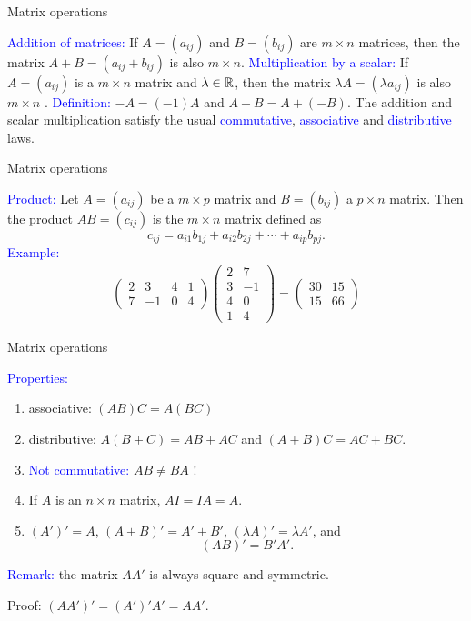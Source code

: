 \documentclass[11pt,aspectratio=169]{beamer}
\begin{document}
\begin{frame}{Matrix operations}

\textcolor{blue}{Addition of matrices: }If $A=(a_{ij})$ and $B=(b_{ij})$  are $m \times n$ matrices, then the matrix
$A+B=(a_{ij}+b_{ij})$ is also $m \times n$.
\vskip 12pt
\textcolor{blue}{Multiplication by a scalar:} If $A=(a_{ij})$ is a $m \times n$ matrix and $\lambda \in \mathbb R$, then
the matrix $\lambda A=(\lambda a_{ij})$ is also $m \times n$ .
\vskip 12pt
\textcolor{blue}{Definition:} $-A=(-1)A$ and $A-B=A+(-B)$.
\vskip 12pt
The addition and scalar multiplication satisfy the usual \textcolor{blue}{commutative}, \textcolor{blue}{associative} and \textcolor{blue}{distributive} laws.\end{frame}


\begin{frame}{Matrix operations}

\textcolor{blue}{Product:} Let $A=(a_{ij})$ be a $m \times p$ matrix and $B=(b_{ij})$ a $p \times n$ matrix. Then the product $AB=(c_{ij})$ is the $m\times n$ matrix defined as
$$
c_{ij}=a_{i1} b_{1j}+a_{i2} b_{2j}+\cdots +a_{ip} b_{pj}.
$$
\textcolor{blue}{Example:}
\begin{align*}\begin{pmatrix}2& 3 & 4 & 1\\
7 & -1 & 0 & 4
\end{pmatrix} \begin{pmatrix}2& 7\\
3 & -1 \\
4 & 0 \\
1& 4
\end{pmatrix}=\begin{pmatrix}30&  15\\
15 & 66
\end{pmatrix}
\end{align*}\end{frame}


\begin{frame}{Matrix operations}

\textcolor{blue}{Properties:} 
\begin{enumerate}
\item associative: $(AB)C=A(BC)$
\item distributive: $A(B+C)=AB+AC$ and $(A+B)C=AC+BC$.
\item \textcolor{blue}{Not commutative:} $AB \neq BA$ ! 
\item If $A$ is an $n \times n$ matrix, $AI=IA=A$.

\item $(A')'=A$, $(A+B)'=A'+B'$,
$(\lambda A)'=\lambda A'$, and $$(AB)'=B'A'.$$
\end{enumerate}

\textcolor{blue}{Remark:} the matrix  $AA'$ is always square and symmetric.

\begin{tiny}Proof: $(AA')'=(A')'A'=AA'$.  \end{tiny}\end{frame}
\end{document}
